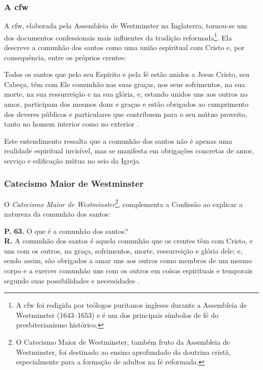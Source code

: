 \subsubsection{A \gls{cfw}} 
A \gls{cfw}, elaborada pela Assembleia de Westminster na Inglaterra, tornou-se um dos documentos confessionais mais influentes da tradição reformada\footnote{A \gls{cfw} foi redigida por teólogos puritanos ingleses durante a Assembleia de Westminster (1643–1653) e é um dos principais símbolos de fé do presbiterianismo histórico.}. Ela descreve a comunhão dos santos como uma união espiritual com Cristo e, por consequência, entre os próprios crentes:

\begin{citacao}
    Todos os santos que pelo seu Espírito e pela fé estão unidos a Jesus Cristo, seu Cabeça, têm com Ele comunhão nas suas graças, nos seus sofrimentos, na sua morte, na sua ressurreição e na sua glória, e, estando unidos uns aos outros no amor, participam dos mesmos dons e graças e estão obrigados ao cumprimento dos deveres públicos e particulares que contribuem para o seu mútuo proveito, tanto no homem interior como no exterior \cite[Cap.~XXVI, §~1º]{cfw}.
\end{citacao}

Este entendimento ressalta que a comunhão dos santos não é apenas uma realidade espiritual invisível, mas se manifesta em obrigações concretas de amor, serviço e edificação mútua no seio da Igreja.

\subsubsection{Catecismo Maior de Westminster}
O \textit{Catecismo Maior de Westminster}\footnote{O Catecismo Maior de Westminster, também fruto da Assembleia de Westminster, foi destinado ao ensino aprofundado da doutrina cristã, especialmente para a formação de adultos na fé reformada.}, complementa a Confissão ao explicar a natureza da comunhão dos santos:

\begin{citacao}
    \textbf{P. 63.} O que é a comunhão dos santos?\\
    \textbf{R.} A comunhão dos santos é aquela comunhão que os crentes têm com Cristo, e uns com os outros, na graça, sofrimentos, morte, ressurreição e glória dele; e, sendo assim, são obrigados a amar uns aos outros como membros de um mesmo corpo e a exercer comunhão uns com os outros em coisas espirituais e temporais segundo suas possibilidades e necessidades \cite{catecismoMaior}.
\end{citacao}


